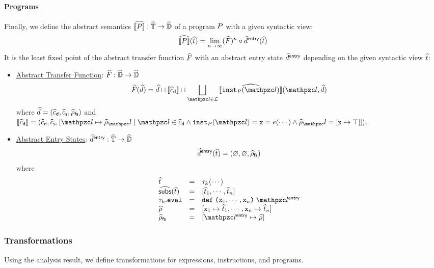 \paragraph{Programs} Finally, we define the abstract semantics $\widehat{\llbracket{P}\rrbracket}:
\widehat{\mathbb{T}} \rightarrow \widehat{\mathbb{D}}$ of a program $P$ with a given syntactic
view:
\[
  \widehat{\llbracket{P}\rrbracket}(\widehat{t}) = \lim_{n \rightarrow \infty}(\widehat{F})^n \circ
  \widehat{d}^{\textsf{entry}}(\widehat{t})
\]
It is the least fixed point of the abstract transfer function $\widehat{F}$ with
an abstract entry state $\widehat{d}^{\textsf{entry}}$ depending on the given syntactic view
$\widehat{t}$:
\begin{itemize}
  \item \underline{Abstract Transfer Function}: $\widehat{F}: \widehat{\mathbb{D}}
    \rightarrow \widehat{\mathbb{D}}$
    \[
      \atransfer(\aelem) = \aelem \join \sem{\adcall} \join
      \bigjoin_{\lab \in \labset}{\asem{\getinst{\prog}(\lab)}(\lab, \aelem)}
    \]
    where $\widehat{d} = (\widehat{c}_{\textsf{d}}, \widehat{c}_{\textsf{s}}, \widehat{\rho}_{\textsf{fs}})$ and $\sem{\adcall} = (\adcall,
    \ascall, [\lab \mapsto \aenv_\lab \mid \lab \in \adcall \wedge
    \getinst{\prog}(\lab) = \varx = \expr(\cdots) \wedge \aenv_\lab = [\varx
    \mapsto \top]])$.
  \item \underline{Abstract Entry States}: $\widehat{d}^{\textsf{entry}}:
    \widehat{\mathbb{T}} \rightarrow \widehat{\mathbb{D}}$
    \[
      \widehat{d}^{\textsf{entry}}(\widehat{t}) = (\varnothing, \varnothing, \widehat{\rho}_{\textsf{fs}})
    \]
    where \[
      \begin{array}{lcl}
        \atree &=& \ty_k \langle \cdots \rangle\\

        \agetsubs(\atree) &=& [\atree_1, \cdots, \atree_n]\\

        \ty_k.\eval &=& \kwdef \; \kwrl \varx_1, \cdots, \varx_n \kwrr
        \; \entrylab\\

        \aenv &=& [\varx_1 \mapsto \atree_1, \cdots, \varx_n \mapsto
        \atree_n]\\

        \afsenv &=& [\entrylab \mapsto \aenv]\\
      \end{array}
    \]
\end{itemize}


\subsubsection{Transformations}

Using the analysis result, we define transformations for expressions,
instructions, and programs.

